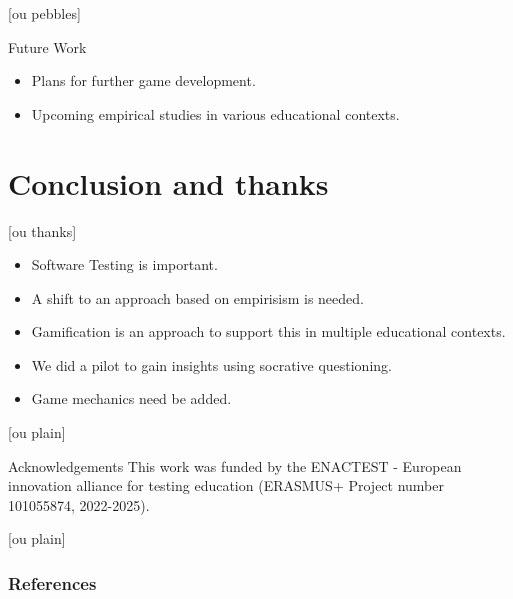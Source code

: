 \documentclass[aspectratio=169]{beamer}
\begin{document}
[ou pebbles]
\begin{frame}{Future Work}
    \begin{itemize}
        \item Plans for further game development.
        \item Upcoming empirical studies in various educational contexts.
    \end{itemize}
\end{frame}

\section{Conclusion and thanks}


[ou thanks]
\begin{frame}{}

\begin{flushright}
\vspace{2cm}
\begin{minipage}{6cm}
\begin{itemize}
    \item Software Testing is important.
    \item A shift to an approach based on empirisism is needed.
    \item Gamification is an approach to support this in multiple educational contexts.
    \item We did a pilot to gain insights using socrative questioning.
    \item Game mechanics need be added.
\end{itemize}
\end{minipage}
\end{flushright}
\end{frame}

[ou plain]
\begin{frame}{Acknowledgements}
    This work was funded by the ENACTEST - European innovation alliance for testing education (ERASMUS+ Project number 101055874, 2022-2025).
\end{frame}

[ou plain]
\begin{frame}[allowframebreaks]
    \frametitle{References}
    \printbibliography
\end{frame}
\end{document}
